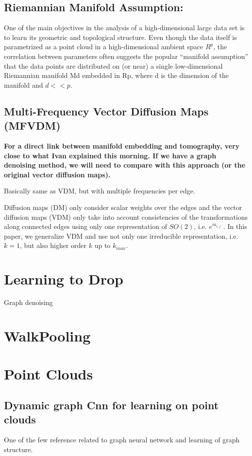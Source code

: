 \subsection{Riemannian Manifold Assumption:}
One of the main objectives in the analysis of a high-dimensional large data set
is to learn its geometric and topological structure. Even though the data itself is
parametrized as a point cloud in a high-dimensional ambient space $R^p$, the correlation
between parameters often suggests the popular “manifold assumption” that
the data points are distributed on (or near) a single low-dimensional Riemannian
manifold Md embedded in Rp, where d is the dimension of the manifold and
$d << p$.


\subsection{Multi-Frequency Vector Diffusion Maps (MFVDM)}
\cite{multiDiffusionMaps}
\textbf{For a direct link between manifold embedding and tomography, very close to what Ivan explained this morning.
If we have a graph denoising method, we will need to compare with this approach 
(or the original vector diffusion maps).}

Basically same as VDM, but with multiple frequencies per edge.

Diffusion maps (DM) only consider scalar weights over the edges and the vector
diffusion maps (VDM) only take into account consistencies
of the transformations along connected edges using only one
representation of $SO(2)$, i.e. $e^{ia_{i,j}}$ . In this paper, we generalize
VDM and use not only one irreducible representation,
i.e. $k = 1$, but also higher order $k$ up to $k_{max}$.





\section{Learning to Drop}
Graph denoising


\section{WalkPooling}


\section{Point Clouds}
\subsection{Dynamic graph Cnn for learning on point clouds}
One of the few reference related to graph neural network and learning of graph structure. 


